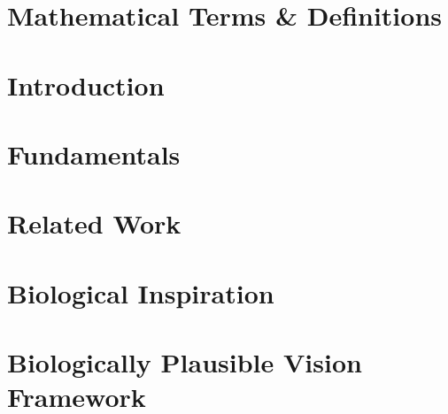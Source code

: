 \documentclass[
    fontsize=10pt,
    twoside=true,
    numbers=noenddot
]{cls/phdbyphd}
\begin{document}
    \listoffigures

    \let\cleardoublepage\bigskip
    \let\clearpage\bigskip
	


\endgroup

\chapter*{Mathematical Terms \& Definitions}
	


\mainmatter
{}


\setchapterpreamble[u]{\margintoc}
\chapter{Introduction}


\setchapterpreamble[u]{\margintoc}
\chapter{Fundamentals}


\setchapterpreamble[u]{\margintoc}
\chapter{Related Work}


\setchapterpreamble[u]{\margintoc}
\chapter{Biological Inspiration}


\setchapterpreamble[u]{\margintoc}
\chapter{Biologically Plausible Vision Framework}

\end{document}
